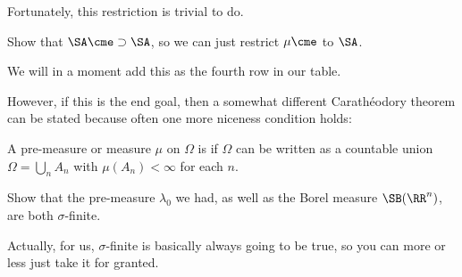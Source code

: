 Fortunately, this restriction is trivial to do.
\begin{ques}
	Show that $\SA\cme \supset \SA$,
	so we can just restrict $\mu\cme$ to $\SA$.
\end{ques}
We will in a moment add this as the fourth row in our table.

However, if this is the end goal,
then a somewhat different Carath\'{e}odory theorem
can be stated because often one more niceness condition holds:
\begin{definition}
	A pre-measure or measure $\mu$ on $\Omega$ is 
	if $\Omega$ can be written as a countable union $\Omega = \bigcup_n A_n$
	with $\mu(A_n) < \infty$ for each $n$.
\end{definition}
\begin{ques}
	Show that the pre-measure $\lambda_0$ we had,
	as well as the Borel measure $\SB(\RR^n)$,
	are both $\sigma$-finite.
\end{ques}
Actually, for us, $\sigma$-finite is basically always going to be true,
so you can more or less just take it for granted.

